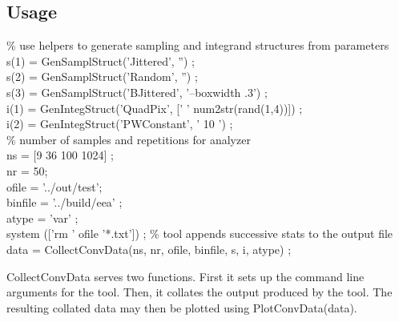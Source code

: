 \subsection{Usage}
\begin{tcolorbox}
 \% use helpers to generate sampling and integrand structures from parameters\\
 s(1) = GenSamplStruct('Jittered', '') ; \\
 s(2) = GenSamplStruct('Random', '') ; \\
 s(3) = GenSamplStruct('BJittered', '--boxwidth .3') ; \\
 i(1) = GenIntegStruct('QuadPix', [' ' num2str(rand(1,4))]) ; \\
 i(2) = GenIntegStruct('PWConstant', ' 10 ') ; \\
 \% number of samples and repetitions for analyzer \\
 ns = [9 36 100 1024] ;\\
 nr =  50;\\
 ofile = '../out/test';\\
 binfile = '../build/eea' ;\\
 atype = 'var' ;\\
 system (['rm ' ofile '*.txt']) ; \% tool appends successive stats to the output file \\
 data = CollectConvData(ns, nr, ofile, binfile, s, i, atype) ;
\end{tcolorbox}
CollectConvData serves two functions. First it sets up the command line arguments for the tool. Then, it collates the output produced by the tool. The resulting collated data may then be plotted using PlotConvData(data).


